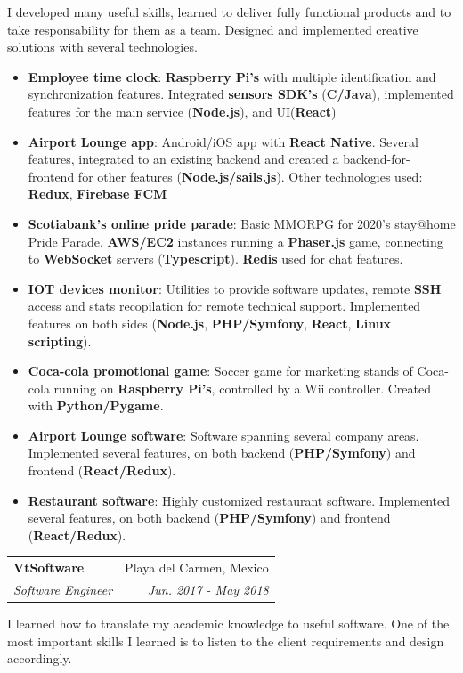 \documentclass[letterpaper,11pt]{article}
\makeatletter
\newcommand{\resumeItem}[2]{
  \item\small{
    \textbf{#1}{: #2 \vspace{-2pt}}
  }
}
\newcommand{\resumeSubheading}[4]{
  \vspace{-1pt}\item
    \begin{tabular*}{0.97\textwidth}{l@{\extracolsep{\fill}}r}
      \textbf{#1} & #2 \\
      \textit{\small#3} & \textit{\small #4} \\
    \end{tabular*}\vspace{-5pt}
}
\newcommand{\resumeItemListStart}{\begin{itemize}}
\newcommand{\resumeItemListEnd}{\end{itemize}\vspace{-5pt}}
\makeatother
\begin{document}
      I developed many useful skills, learned to deliver fully functional
      products and to take responsability for them as a team. Designed and implemented
      creative solutions with several technologies.
      \resumeItemListStart
        \resumeItem{Employee time clock}
          {\textbf{Raspberry Pi's} with multiple identification and synchronization features. Integrated
            \textbf{sensors SDK's} (\textbf{C/Java}), implemented features for the main service
            (\textbf{Node.js}), and UI(\textbf{React})}
        \resumeItem{Airport Lounge app}
          {Android/iOS app with \textbf{React Native}. Several features, integrated to an
          existing backend and created a backend-for-frontend for other features
          (\textbf{Node.js/sails.js}). Other technologies used: \textbf{Redux}, \textbf{Firebase FCM}}
        \resumeItem{Scotiabank's online pride parade}
        {Basic MMORPG for 2020's stay@home Pride Parade. \textbf{AWS/EC2} instances
          running a \textbf{Phaser.js} game, connecting to \textbf{WebSocket} servers (\textbf{Typescript}). \textbf{Redis} 
          used for chat features.}
        \resumeItem{IOT devices monitor}
          {Utilities to provide software updates, remote \textbf{SSH} access and stats
            recopilation for remote technical support. Implemented features on
            both sides (\textbf{Node.js}, \textbf{PHP/Symfony}, \textbf{React}, \textbf{Linux scripting}).}
        \resumeItem{Coca-cola promotional game}
          {Soccer game for marketing stands of Coca-cola running on \textbf{Raspberry Pi's},
            controlled by a Wii controller. Created with \textbf{Python/Pygame}.}
        \resumeItem{Airport Lounge software}
          {Software spanning several company areas. Implemented several
            features, on both backend (\textbf{PHP/Symfony}) and frontend (\textbf{React/Redux}).}
        \resumeItem{Restaurant software}
          {Highly customized restaurant software. Implemented several features,
            on both backend (\textbf{PHP/Symfony}) and frontend (\textbf{React/Redux}).}
      \resumeItemListEnd

    \resumeSubheading
      {VtSoftware}{Playa del Carmen, Mexico}
      {Software Engineer}{Jun. 2017 - May 2018}
      \vspace{3pt}

      I learned how to translate my academic knowledge to useful software. One
      of the most important skills I learned is to listen to the client
      requirements and design accordingly.
\end{document}
